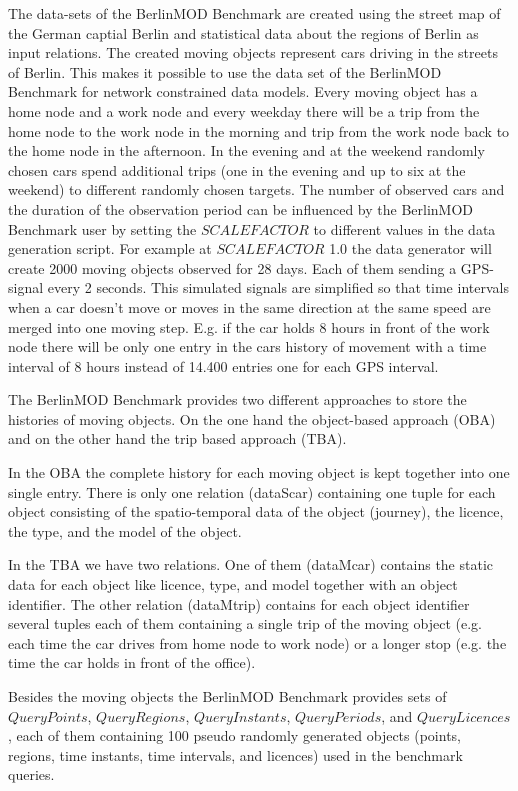 \documentclass[a4paper]{article}
\newcommand{\bmodb} {BerlinMOD Benchmark}
\begin{document}
The data-sets of the \bmodb{} are created using the street map of the German
captial Berlin \cite{bbike} and statistical data about the regions of Berlin \cite{bevberlin,berlinstadtatlas} as input relations.
The created moving objects represent cars driving in the streets of Berlin.
This makes it possible to use the data set of the \bmodb{} for network constrained
 data models. Every moving object has a home node and a work node and every weekday
 there will be a trip from the home node to the work node in the morning and trip
from the work node back to the home node in the afternoon. In the evening and at
the weekend randomly chosen cars spend additional trips (one in the evening and up
to six at the weekend) to different randomly chosen targets. The number of observed
cars and the duration of the observation period can be influenced by the \bmodb{}
user by setting the $SCALEFACTOR$ to different values in the data generation
script. For example at $SCALEFACTOR$ 1.0 the data generator will create 2000
moving objects observed for 28 days. Each of them sending a GPS-signal every 2
seconds. This simulated signals are simplified so that time intervals when a car
 doesn't move or moves in the same direction at the same speed are merged into
one moving step. E.g. if the car holds 8 hours in front of the work node there
 will be only one entry in the cars history of movement with a time interval of
8 hours instead of 14.400 entries one for each GPS interval.

The \bmodb{} provides two different approaches to store the histories of moving
objects. On the one hand the object-based approach (OBA) and on the other hand
the trip based approach (TBA).

In the OBA the complete history for each moving object
is kept together into one single entry. There is only one relation (dataScar)
containing one tuple for each object consisting of the spatio-temporal data of
the object (journey), the licence, the type, and the model of the object.

In the TBA we have two relations. One of them (dataMcar) contains the static data
 for each object like licence, type, and model together with an object identifier.
The other relation (dataMtrip) contains for each object identifier several tuples
each of them containing a single trip of the moving object (e.g. each time the car
drives from home node to work node) or a longer stop (e.g. the time the car holds
in front of the office).

Besides the moving objects the \bmodb{} provides sets of $QueryPoints$,
$QueryRegions$, $QueryInstants$, $QueryPeriods$, and $QueryLicences$,
 each of them containing 100 pseudo randomly generated objects (points, regions,
time instants, time intervals, and licences) used in the benchmark queries.
\end{document}

